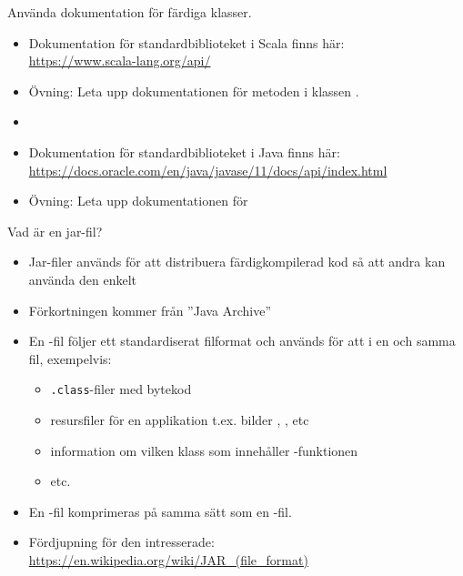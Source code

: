 \begin{Slide}{Använda dokumentation för färdiga klasser.}
\begin{itemize}
  \item Dokumentation för standardbiblioteket i Scala finns här:  \\ \url{https://www.scala-lang.org/api/}
  \item Övning: Leta upp dokumentationen för metoden  i klassen .
  \item[]
  \item Dokumentation för standardbiblioteket i Java finns här:  \\ 
  \url{https://docs.oracle.com/en/java/javase/11/docs/api/index.html}
  \item Övning: Leta upp dokumentationen för 

\end{itemize}
\end{Slide}



\begin{Slide}{Vad är en jar-fil?}
\begin{itemize}
  \item Jar-filer används för att distribuera färdigkompilerad kod så att andra kan använda den enkelt
  \item Förkortningen  kommer från ''Java Archive''
  \item En -fil följer ett standardiserat filformat och används för att  i en och samma fil, exempelvis:
  \begin{itemize}
    \item \texttt{.class}-filer med bytekod
    \item resursfiler för en applikation t.ex. bilder , , etc
    \item information om vilken klass som innehåller -funktionen
    \item etc.
  \end{itemize}
  \item En -fil komprimeras på samma sätt som en -fil.
  \item Fördjupning för den intresserade:\\
  {\SlideFontTiny\url{https://en.wikipedia.org/wiki/JAR_(file_format)}}
\end{itemize}
\end{Slide}


